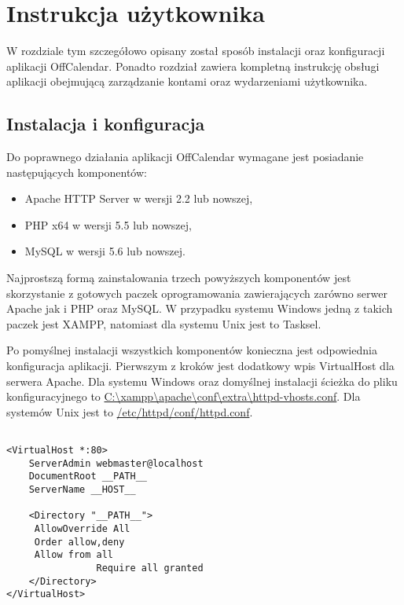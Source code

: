 \chapter{Instrukcja użytkownika}
\label{cha:instrUzytk}

W rozdziale tym szczegółowo opisany został sposób instalacji oraz konfiguracji aplikacji OffCalendar. Ponadto rozdział zawiera kompletną instrukcję obsługi aplikacji obejmującą zarządzanie kontami oraz wydarzeniami użytkownika.

\section{Instalacja i konfiguracja}
\label{sec:instKonf}

Do poprawnego działania aplikacji OffCalendar wymagane jest posiadanie następujących komponentów:

\begin{itemize}
\item Apache HTTP Server w wersji 2.2 lub nowszej,
\item PHP x64 w wersji 5.5 lub nowszej,
\item MySQL w wersji 5.6 lub nowszej.
\end{itemize}

Najprostszą formą zainstalowania trzech powyższych komponentów jest skorzystanie z gotowych paczek oprogramowania zawierających zarówno serwer Apache jak i PHP oraz MySQL. W przypadku systemu Windows jedną z takich paczek jest XAMPP, natomiast dla systemu Unix jest to Tasksel.

Po pomyślnej instalacji wszystkich komponentów konieczna jest odpowiednia konfiguracja aplikacji. Pierwszym z kroków jest dodatkowy wpis VirtualHost dla serwera Apache. Dla systemu Windows oraz domyślnej instalacji ścieżka do pliku konfiguracyjnego to \url{C:\xampp\apache\conf\extra\httpd-vhosts.conf}. Dla systemów Unix jest to \url{/etc/httpd/conf/httpd.conf}.

\begin{lstlisting}[caption=Konfiguracja serwera Apache., label=amb, captionpos=b]

<VirtualHost *:80>
    ServerAdmin webmaster@localhost
    DocumentRoot __PATH__
    ServerName __HOST__

    <Directory "__PATH__">
   	 AllowOverride All
   	 Order allow,deny
   	 Allow from all
            	Require all granted
    </Directory>
</VirtualHost>

\end{lstlisting}

